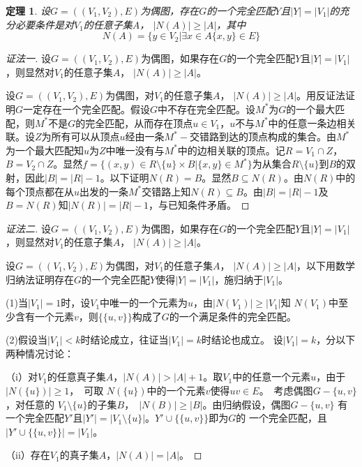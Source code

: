 \documentclass{article}
\newtheorem{Thm}{定理}
\begin{document}
\begin{CJK*}{UTF8}{gbsn}
    \begin{Thm}
    设$G=((V_1,V_2),E)$为偶图，存在$G$的一个完全匹配$Y$且$|Y| = |V_1|$的充分必要条件是对$V_1$的任意子集$A$， $|N(A)| \geq |A|$，其中\[N(A) = \{y\in V_2|\exists x \in A \{x,y\} \in E\}\]
  \end{Thm}
  \begin{proof}[证法一]
    设$G=((V_1,V_2),E)$为偶图，如果存在$G$的一个完全匹配$Y$且$|Y| = |V_1|$，则显然对$V_1$的任意子集$A$， $|N(A)| \geq |A|$。

        设$G=((V_1,V_2),E)$为偶图，对$V_1$的任意子集$A$， $|N(A)| \geq |A|$。用反证法证明$G$一定存在一个完全匹配。假设$G$中不存在完全匹配。设$M^*$为$G$的一个最大匹配，则$M^*$不是$G$的完全匹配，从而存在顶点$u\in V_1$，$u$不与$M^*$中的任意一条边相关联。设$Z$为所有可以从顶点$u$经由一条$M^*-$交错路到达的顶点构成的集合。由$M^*$为一个最大匹配知$u$为$Z$中唯一没有与$M^*$中的边相关联的顶点。记$R=V_1\cap Z$，$B=V_2\cap Z$。显然$f=\{(x,y)\in R\setminus \{u\}\times B | \{x,y\}\in M^*\}$为从集合$R\setminus \{u\}$到$B$的双射，因此$|B|=|R|-1$。以下证明$N(R)=B$。显然$B\subseteq N(R)$。由$N(R)$中的每个顶点都在从$u$出发的一条$M^*$交错路上知$N(R)\subseteq B$。由$|B|=|R|-1$及$B= N(R)$知$|N(R)|=|R|-1$，与已知条件矛盾。
  \end{proof}
  \begin{proof}[证法二]
设$G=((V_1,V_2),E)$为偶图，如果存在$G$的一个完全匹配$Y$且$|Y| = |V_1|$，则显然对$V_1$的任意子集$A$， $|N(A)| \geq |A|$。

设$G=((V_1,V_2),E)$为偶图，对$V_1$的任意子集$A$， $|N(A)| \geq |A|$，以下用数学归纳法证明存在$G$的一个完全匹配$Y$使得$|Y| = |V_1|$，施归纳于$|V_1|$。

(1)当$|V_1|=1$时，设$V_1$中唯一的一个元素为$u$，由$|N(V_1)| \geq |V_1|$知
$N(V_1)$中至少含有一个元素$v$，则$\{\{u,v\}\}$构成了$G$的一个满足条件的完全匹配。

(2)假设当$|V_1|<k$时结论成立，往证当$|V_1|=k$时结论也成立。
设$|V_1|=k$，分以下两种情况讨论：

（i）对$V_1$的任意真子集$A$，$|N(A)| > |A| + 1$。取$V_1$中的任意一个元素$u$，由于$|N(\{u\})| \geq 1$，　可取
$N(\{u\})$中的一个元素$v$使得$uv \in E$。　考虑偶图$G-\{u,v\}$，对任意的
$V_1\setminus \{u\}$的子集$B$，　$|N(B)| \geq |B|$。由归纳假设，偶图$G-\{u,v\}$
有一个完全匹配$Y'$且$|Y'| = |V_1\setminus \{u\}|$。$Y' \cup \{\{u,v\}\}$即为$G$的
一个完全匹配，且$|Y' \cup \{\{u,v\}\}| = |V_1|$。

（ii）存在$V_1$的真子集$A$，$|N(A)| = |A|$。


\end{proof}
\end{CJK*}
\end{document}
